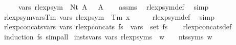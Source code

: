 \begin{isabellebody}
\ \ \ \ \ {\isachardoublequoteopen}vars\ {\isacharparenleft}{\kern0pt}rlexp{\isacharunderscore}{\kern0pt}sym\ {\isasymgamma}{\isacharprime}{\kern0pt}\ {\isacharparenleft}{\kern0pt}Nt\ A{\isacharparenright}{\kern0pt}{\isacharparenright}{\kern0pt}\ {\isacharequal}{\kern0pt}\ {\isacharbraceleft}{\kern0pt}{\isasymgamma}{\isacharprime}{\kern0pt}\ A{\isacharbraceright}{\kern0pt}{\isachardoublequoteclose}\isanewline
%
\isadelimproof
\ \ %
\endisadelimproof
%
\isatagproof
{}\isamarkupfalse%
\ assms\ \isamarkupfalse%
\ rlexp{\isacharunderscore}{\kern0pt}sym{\isacharunderscore}{\kern0pt}def\ \isamarkupfalse%
\ simp%
\endisatagproof
{\isafoldproof}%
%
\isadelimproof
\isanewline
%
\endisadelimproof
\isanewline
{}\isamarkupfalse%
\ rlexp{\isacharunderscore}{\kern0pt}sym{\isacharunderscore}{\kern0pt}vars{\isacharunderscore}{\kern0pt}Tm{\isacharcolon}{\kern0pt}\ {\isachardoublequoteopen}vars\ {\isacharparenleft}{\kern0pt}rlexp{\isacharunderscore}{\kern0pt}sym\ {\isasymgamma}{\isacharprime}{\kern0pt}\ {\isacharparenleft}{\kern0pt}Tm\ x{\isacharparenright}{\kern0pt}{\isacharparenright}{\kern0pt}\ {\isacharequal}{\kern0pt}\ {\isacharbraceleft}{\kern0pt}{\isacharbraceright}{\kern0pt}{\isachardoublequoteclose}\isanewline
%
\isadelimproof
\ \ %
\endisadelimproof
%
\isatagproof
{}\isamarkupfalse%
\ rlexp{\isacharunderscore}{\kern0pt}sym{\isacharunderscore}{\kern0pt}def\ \isamarkupfalse%
\ simp%
\endisatagproof
{\isafoldproof}%
%
\isadelimproof
\isanewline
%
\endisadelimproof
\isanewline
{}\isamarkupfalse%
\ rlexp{\isacharunderscore}{\kern0pt}concats{\isacharunderscore}{\kern0pt}vars{\isacharcolon}{\kern0pt}\ {\isachardoublequoteopen}vars\ {\isacharparenleft}{\kern0pt}rlexp{\isacharunderscore}{\kern0pt}concats\ fs{\isacharparenright}{\kern0pt}\ {\isacharequal}{\kern0pt}\ {\isasymUnion}{\isacharparenleft}{\kern0pt}vars\ {\isacharbackquote}{\kern0pt}\ set\ fs{\isacharparenright}{\kern0pt}{\isachardoublequoteclose}\isanewline
%
\isadelimproof
\ \ %
\endisadelimproof
%
\isatagproof
{}\isamarkupfalse%
\ rlexp{\isacharunderscore}{\kern0pt}concats{\isacharunderscore}{\kern0pt}def\ \isamarkupfalse%
\ {\isacharparenleft}{\kern0pt}induction\ fs{\isacharparenright}{\kern0pt}\ simp{\isacharunderscore}{\kern0pt}all%
\endisatagproof
{\isafoldproof}%
%
\isadelimproof
\isanewline
%
\endisadelimproof
\isanewline
\isanewline
{}\isamarkupfalse%
\ insts{\isacharprime}{\kern0pt}{\isacharunderscore}{\kern0pt}vars{\isacharcolon}{\kern0pt}\ {\isachardoublequoteopen}vars\ {\isacharparenleft}{\kern0pt}rlexp{\isacharunderscore}{\kern0pt}syms\ {\isasymgamma}{\isacharprime}{\kern0pt}\ w{\isacharparenright}{\kern0pt}\ {\isasymsubseteq}\ {\isasymgamma}{\isacharprime}{\kern0pt}\ {\isacharbackquote}{\kern0pt}\ nts{\isacharunderscore}{\kern0pt}syms\ w{\isachardoublequoteclose}\isanewline

\end{isabellebody}
